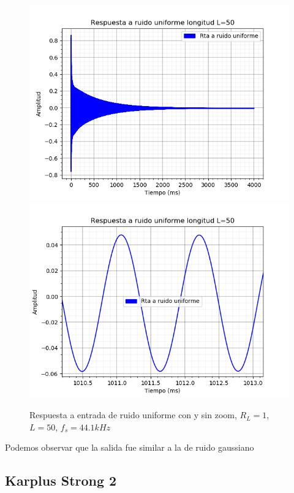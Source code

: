 \documentclass[assd_tp2_main.tex]{subfiles}
\begin{document}
\begin{figure}[H]
	\includegraphics[scale=0.55]{graficos/randomBloqueS1.png}
	\includegraphics[scale=0.55]{graficos/randomBloqueS1zoom.png}
	\caption{Respuesta a entrada de ruido uniforme con y sin zoom, $R_L=1$, $L=50$, $f_s=44.1kHz$}
\end{figure}

Podemos observar que la salida fue similar a la de ruido gaussiano

\subsection{Karplus Strong 2}
\end{document}
